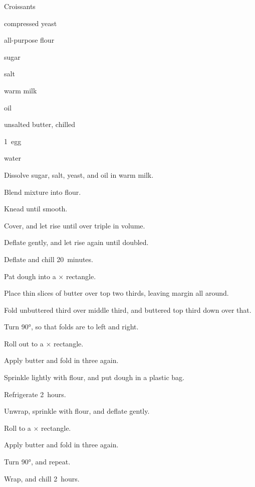 \begin{recipe}{Croissants}{}{}

\begin{ingredients}
\item {} compressed yeast
\item \C{1\threequarter} all-purpose flour
\item {} sugar
\item \tp{1\half} salt
\item {} warm milk
\item {} oil
\item \C{\twothird} unsalted butter, chilled
\item 1~egg
\item {} water
\end{ingredients}

\begin{directions}
\item Dissolve sugar, salt, yeast, and oil in warm milk.
\item Blend mixture into flour.
\item Knead until smooth.
\item Cover, and let rise until over triple in volume.
\item Deflate gently, and let rise again until doubled.
\item Deflate and chill 20~minutes.
\item Pat dough into a $\times$ rectangle.
\item Place thin slices of butter over top two thirds, leaving \cm{\half} margin all around.
\item Fold unbuttered third over middle third, and buttered top third down over that.
\item Turn \ang{90}, so that folds are to left and right.
\item Roll out to a $\times$ rectangle.
\item Apply butter and fold in three again.
\item Sprinkle lightly with flour, and put dough in a plastic bag.
\item Refrigerate 2~hours.
\item Unwrap, sprinkle with flour, and deflate gently.
\item Roll to a $\times$ rectangle.
\item Apply butter and fold in three again.
\item Turn \ang{90}, and repeat.
\item Wrap, and chill 2~hours.

\end{directions}
\end{recipe}
